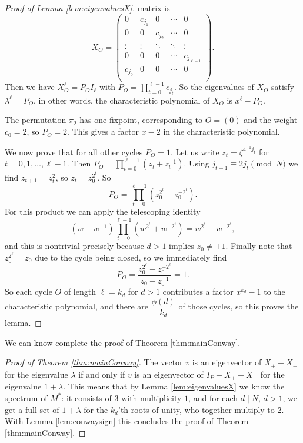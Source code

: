 \documentclass[10pt]{article}
\theoremstyle{definition}
\newcommand{\dprod}{\displaystyle\prod}
\begin{document}
\begin{proof}[Proof of Lemma \ref{lem:eigenvaluesX}]
    matrix is
    \[ X_O = \begin{pmatrix}
        0       & c_{j_1} & 0       & \cdots & 0 \\
        0       & 0       & c_{j_2} & \cdots & 0 \\
        \vdots  & \vdots  & \ddots  & \ddots & \vdots \\
        0       & 0       & 0       & \cdots & c_{j_{\ell-1}} \\
        c_{j_0} & 0       & 0       & \cdots & 0 \\
    \end{pmatrix} . \]
    Then we have $ X_O^{\ell} = P_O I_{\ell} $ with $ P_O = \dprod_{t=0}^{\ell-1} c_{j_t} $. So the eigenvalues
    of $ X_O $ satisfy $ \lambda^{\ell} = P_O $, in other words, the characteristic polynomial of $ X_O $ is
    $ x^{\ell} - P_O $.

    The permutation $ \pi_2 $ has one fixpoint, corresponding to $ O = (0) $ and the weight $ c_0 = 2 $, so
    $ P_O = 2 $. This gives a factor $ x - 2 $ in the characteristic polynomial.

    We now prove that for all other cycles $ P_O = 1 $. Let us write $ z_t = \zeta^{4^{-1} j_t} $ for
    $ t = 0, 1, \ldots, \ell-1 $. Then $ P_O = \dprod_{t=0}^{\ell-1} \left( z_t + z_t^{-1} \right) $.
    Using $ j_{t+1} \equiv 2 j_t \pmod{N} $ we find $ z_{t+1} = z_t^2 $, so $ z_t = z_0^{2^t} $. So
    \[ P_O = \dprod_{t=0}^{\ell-1} \left( z_0^{2^t} + z_0^{-2^t} \right) . \]
    For this product we can apply the telescoping identity
    \[ (w - w^{-1}) \dprod_{t=0}^{\ell-1} \left( w^{2^t} + w^{-2^t} \right) = w^{2^{\ell}} - w^{-2^{\ell}} , \]
    and this is nontrivial precisely because $ d > 1 $ implies $ z_0 \neq \pm 1 $. Finally note that
    $ z_0^{2^{\ell}} = z_0 $ due to the cycle being closed, so we immediately find
    \[ P_O = \dfrac{z_0^{2^{\ell}} - z_0^{-2^{\ell}}}{z_0 - z_0^{-1}} = 1. \]
    So each cycle $ O $ of length $ \ell = k_d $ for $ d > 1 $ contributes a factor $ x^{k_d} - 1 $ to the
    characteristic polynomial, and there are $ \dfrac{\phi(d)}{k_d} $ of those cycles, so this proves the lemma.
\end{proof}

We can know complete the proof of Theorem \ref{thm:mainConway}.

\begin{proof}[Proof of Theorem \ref{thm:mainConway}]
    The vector $ v $ is an eigenvector of $ X_+ + X_- $ for the eigenvalue $ \lambda $ if and only if $ v $
    is an eigenvector of $ I_P + X_+ + X_- $ for the eigenvalue $ 1 + \lambda $. This means that by Lemma
    \ref{lem:eigenvaluesX} we know the spectrum of $ M^{\ast} $: it consists of $ 3 $ with multiplicity
    $ 1 $, and for each $ d \mid N $, $ d > 1 $, we get a full set of $ 1 + \lambda $ for the $ k_d $'th
    roots of unity, who together multiply to $ 2 $. With Lemma \ref{lem:conwaysign} this concludes the proof
    of Theorem \ref{thm:mainConway}.
\end{proof}
\end{document}
